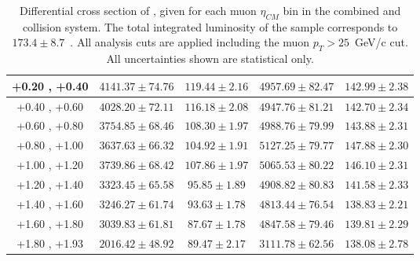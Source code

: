 \begin{table}[h!]
{\begin{tabular}{|c|*4c|}
    \hline
    +0.20 , +0.40 & $4141.37 \pm 74.76$ & $119.44 \pm 2.16$ & $4957.69 \pm 82.47$ & $142.99 \pm 2.38$\\
    \hline
    +0.40 , +0.60 & $4028.20 \pm 72.11$ & $116.18 \pm 2.08$ & $4947.76 \pm 81.21$ & $142.70 \pm 2.34$\\
    \hline
    +0.60 , +0.80 & $3754.85 \pm 68.46$ & $108.30 \pm 1.97$ & $4988.76 \pm 79.99$ & $143.88 \pm 2.31$\\
    \hline
    +0.80 , +1.00 & $3637.63 \pm 66.32$ & $104.92 \pm 1.91$ & $5127.25 \pm 79.77$ & $147.88 \pm 2.30$\\
    \hline
    +1.00 , +1.20 & $3739.86 \pm 68.42$ & $107.86 \pm 1.97$ & $5065.53 \pm 80.22$ & $146.10 \pm 2.31$\\
    \hline
    +1.20 , +1.40 & $3323.45 \pm 65.58$ & $95.85 \pm 1.89$ & $4908.82 \pm 80.83$ & $141.58 \pm 2.33$\\
    \hline
    +1.40 , +1.60 & $3246.27 \pm 61.74$ & $93.63 \pm 1.78$ & $4813.44 \pm 76.54$ & $138.83 \pm 2.21$\\
    \hline
    +1.60 , +1.80 & $3039.83 \pm 61.81$ & $87.67 \pm 1.78$ & $4847.58 \pm 79.46$ & $139.81 \pm 2.29$\\
    \hline
    +1.80 , +1.93 & $2016.42 \pm 48.92$ & $89.47 \pm 2.17$ & $3111.78 \pm 62.56$ & $138.08 \pm 2.78$\\
    \hline
  \end{tabular}
  }
  \caption{Differential cross section of \WToMuNu, given for each muon $\eta_{CM}$ bin in the combined \pPb and \Pbp collision system. The total integrated luminosity of the sample corresponds to $173.4 \pm 8.7$~\nbinv. All analysis cuts are applied including the muon $p_{T} > 25$~GeV/c cut. All uncertainties shown are statistical only.}
  \label{tab:CrossSection_WToMu_PA}
\end{table}


